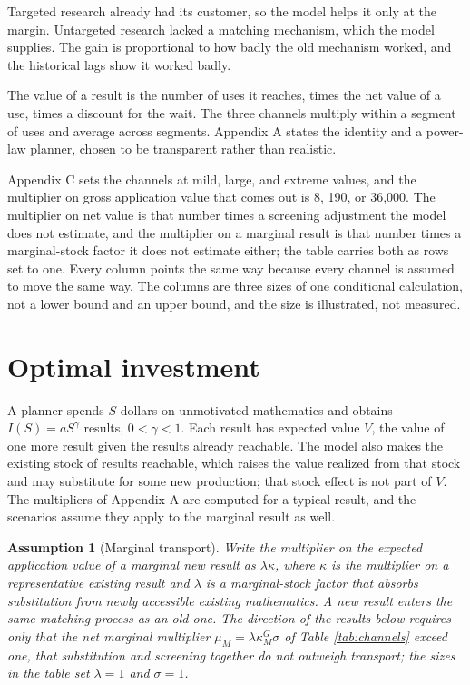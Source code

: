\documentclass[11pt]{article}
\newtheorem{assumption}{Assumption}
\theoremstyle{definition}
\theoremstyle{remark}
\begin{document}
Targeted research already had its customer, so the model helps it only at the margin. Untargeted research lacked a matching mechanism, which the model supplies. The gain is proportional to how badly the old mechanism worked, and the historical lags show it worked badly.

The value of a result is the number of uses it reaches, times the net value of a use, times a discount for the wait. The three channels multiply within a segment of uses and average across segments. Appendix A states the identity and a power-law planner, chosen to be transparent rather than realistic.

Appendix C sets the channels at mild, large, and extreme values, and the multiplier on gross application value that comes out is 8, 190, or 36{,}000. The multiplier on net value is that number times a screening adjustment the model does not estimate, and the multiplier on a marginal result is that number times a marginal-stock factor it does not estimate either; the table carries both as rows set to one. Every column points the same way because every channel is assumed to move the same way. The columns are three sizes of one conditional calculation, not a lower bound and an upper bound, and the size is illustrated, not measured.

\section{Optimal investment}

A planner spends $S$ dollars on unmotivated mathematics and obtains $I(S) = a S^{\gamma}$ results, $0 < \gamma < 1$. Each result has expected value $V$, the value of one more result given the results already reachable. The model also makes the existing stock of results reachable, which raises the value realized from that stock and may substitute for some new production; that stock effect is not part of $V$. The multipliers of Appendix A are computed for a typical result, and the scenarios assume they apply to the marginal result as well.

\begin{assumption}[Marginal transport]\label{ass:transport}
Write the multiplier on the expected application value of a marginal new result as $\lambda\kappa$, where $\kappa$ is the multiplier on a representative existing result and $\lambda$ is a marginal-stock factor that absorbs substitution from newly accessible existing mathematics. A new result enters the same matching process as an old one. The direction of the results below requires only that the net marginal multiplier $\mu_M = \lambda\kappa^G_M\sigma$ of Table \ref{tab:channels} exceed one, that substitution and screening together do not outweigh transport; the sizes in the table set $\lambda = 1$ and $\sigma = 1$.
\end{assumption}
\end{document}
